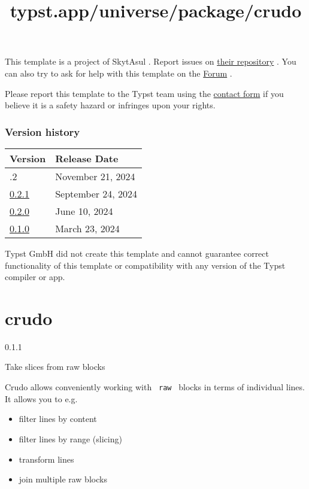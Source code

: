 This template is a project of SkytAsul . Report issues on
\href{https://github.com/SkytAsul/INSA-Typst-Template}{their repository}
. You can also try to ask for help with this template on the
\href{https://forum.typst.app}{Forum} .

Please report this template to the Typst team using the
\href{https://typst.app/contact}{contact form} if you believe it is a
safety hazard or infringes upon your rights.

\label{versions}
\subsubsection{Version history}\label{version-history}

\begin{longtable}[]{@{}ll@{}}
\toprule\noalign{}
Version & Release Date \\
\midrule\noalign{}
\endhead
\bottomrule\noalign{}
\endlastfoot
0.2.2 & November 21, 2024 \\
\href{https://typst.app/universe/package/silky-letter-insa/0.2.1/}{0.2.1}
& September 24, 2024 \\
\href{https://typst.app/universe/package/silky-letter-insa/0.2.0/}{0.2.0}
& June 10, 2024 \\
\href{https://typst.app/universe/package/silky-letter-insa/0.1.0/}{0.1.0}
& March 23, 2024 \\
\end{longtable}

Typst GmbH did not create this template and cannot guarantee correct
functionality of this template or compatibility with any version of the
Typst compiler or app.


\title{typst.app/universe/package/crudo}

\label{banner}
\section{crudo}\label{crudo}

{ 0.1.1 }

Take slices from raw blocks

\label{readme}
Crudo allows conveniently working with \texttt{\ raw\ } blocks in terms
of individual lines. It allows you to e.g.

\begin{itemize}
\tightlist
\item
  filter lines by content
\item
  filter lines by range (slicing)
\item
  transform lines
\item
  join multiple raw blocks
\end{itemize}

